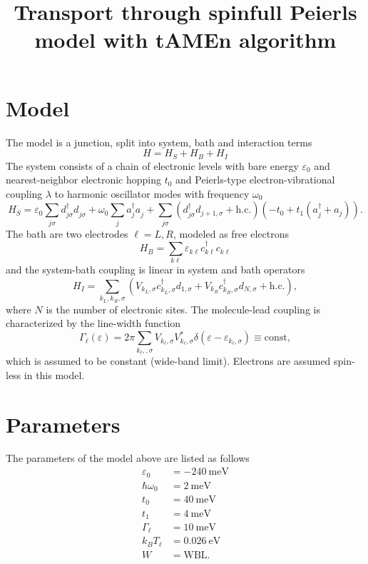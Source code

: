 \documentclass{article}
\newcommand{\pdagger}{{\phantom{\dagger}}}
\begin{document}
\title{Transport through spinfull Peierls model with tAMEn algorithm}
\maketitle

\section{Model}
The model is a junction, split into system, bath and interaction terms
\begin{equation}
	H = H_S + H_B + H_I
\end{equation}  
The system consists of a chain of electronic levels with bare energy $\varepsilon_0$ and nearest-neighbor electronic hopping $t_0$ and Peierls-type electron-vibrational coupling $\lambda$ to harmonic oscillator modes with frequency $\omega_0$
\begin{equation}
	H_S = \varepsilon_0 \sum_{j\sigma}  d^\dagger_{j\sigma} d_{j\sigma}^\pdagger + \omega_0 \sum_j a_j^\dagger a_j^\pdagger + \sum_{j\sigma} (d_{j\sigma}^\dagger d_{j+1,\sigma} + \mathrm{h.c.})( -t_0 + t_1(a_j^\dagger + a_j)).
\end{equation}
The bath are two electrodes $\ell=L,R$, modeled as free electrons
\begin{equation}
	H_B = \sum_{k\ell} \varepsilon_{k\ell}c^\dagger_{k\ell}c^\pdagger_{k\ell}
\end{equation}
and the system-bath coupling is linear in system and bath operators
\begin{equation}
	H_I = \sum_{k_L, k_R,\sigma} (V_{k_L,\sigma} c_{k_L,\sigma}^\dagger d_{1,\sigma} + V_{k_R} c_{k_R,\sigma}^\dagger d_{N,\sigma}  + \mathrm{h.c.}),
\end{equation}
where $N$ is the number of electronic sites. The molecule-lead coupling is characterized by the line-width function
\begin{equation}
	\Gamma_\ell(\varepsilon) = 2\pi\sum_{k_\ell, ,\sigma} V_{k_\ell,\sigma}V_{k_\ell,\sigma}^* \delta(\varepsilon-\varepsilon_{k_\ell,\sigma}) \equiv \mathrm{const},
\end{equation}
which is assumed to be constant (wide-band limit). Electrons are assumed spin-less in this model.
\section{Parameters}
The parameters of the model above are listed as follows
\begin{align*}
	\varepsilon_0 &= -\SI{240}{\milli\electronvolt}\\
	\hbar \omega_0 &= \SI{2}{\milli\electronvolt}\\
	t_0 &= \SI{40}{\milli\electronvolt}\\
	t_1 &=\SI{4}{\milli\electronvolt}\\ 
	\Gamma_\ell &= \SI{10}{\milli\electronvolt}\\
	k_B T_\ell &= \SI{0.026}{\electronvolt}\\ 
	W&=\mathrm{WBL}.
\end{align*}
\clearpage
\end{document}
